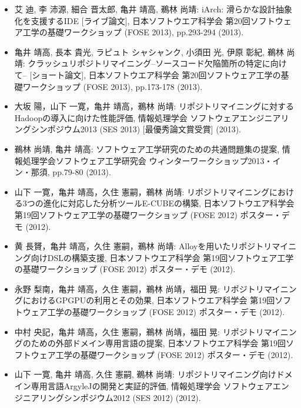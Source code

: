 \documentclass{jarticle}
\begin{document}
\begin{itemize}
\item 艾 迪, 李 沛源, 細合 晋太郎, 亀井 靖高, 鵜林 尚靖:
iArch: 滑らかな設計抽象化を支援するIDE [ライブ論文],
日本ソフトウエア科学会 第20回ソフトウェア工学の基礎ワークショップ (FOSE 2013), pp.293-294 (2013).

\item 亀井 靖高, 長本 貴光, ラピュト シャシャンク, 小須田 光, 伊原 彰紀, 鵜林 尚靖:
クラッシュリポジトリマイニング--ソースコード欠陥箇所の特定に向けて-- [ショート論文],
日本ソフトウエア科学会 第20回ソフトウェア工学の基礎ワークショップ (FOSE 2013), pp.173-178 (2013).

\item 大坂 陽，山下 一寛，亀井 靖高，鵜林 尚靖:
リポジトリマイニングに対するHadoopの導入に向けた性能評価,
情報処理学会 ソフトウェアエンジニアリングシンポジウム2013 (SES 2013)  [最優秀論文賞受賞] (2013).

\item 鵜林 尚靖, 亀井 靖高:
ソフトウェア工学研究のための共通問題集の提案,
情報処理学会ソフトウェア工学研究会 ウィンターワークショップ2013・イン・那須, pp.79-80 (2013).

\item 山下 一寛，亀井 靖高，久住 憲嗣，鵜林 尚靖:
リポジトリマイニングにおける3つの進化に対応した分析ツールE-CUBEの構築,
日本ソフトウエア科学会 第19回ソフトウェア工学の基礎ワークショップ (FOSE 2012) ポスター・デモ (2012).

\item 黄 長贇，亀井 靖高，久住 憲嗣，鵜林 尚靖:
Alloyを用いたリポジトリマイニング向けDSLの構築支援,
日本ソフトウエア科学会 第19回ソフトウェア工学の基礎ワークショップ (FOSE 2012) ポスター・デモ (2012).

\item 永野 梨南，亀井 靖高，久住 憲嗣，鵜林 尚靖，福田 晃:
リポジトリマイニングにおけるGPGPUの利用とその効果,
日本ソフトウエア科学会 第19回ソフトウェア工学の基礎ワークショップ (FOSE 2012) ポスター・デモ (2012).

\item 中村 央記，亀井 靖高，久住 憲嗣，鵜林 尚靖，福田 晃:
リポジトリマイニングのための外部ドメイン専用言語の提案,
日本ソフトウエア科学会 第19回ソフトウェア工学の基礎ワークショップ (FOSE 2012) ポスター・デモ (2012).

\item 山下 一寛, 亀井 靖高, 久住 憲嗣, 鵜林 尚靖:
リポジトリマイニング向けドメイン専用言語ArgyleJの開発と実証的評価,
情報処理学会 ソフトウェアエンジニアリングシンポジウム2012 (SES 2012) (2012).


\end{itemize}
\end{document}
